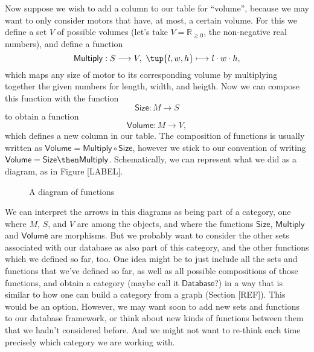 Now suppose we wish to add a column to our table for ``volume'', because we may want to only consider motors that have, at most, a certain volume. For this we define a set $V$ of possible volumes (let's take $V = \mathbb{R}_{\geq 0}$, the non-negative real numbers), and define a function 
$$
\mathsf{Multiply}: S \longrightarrow V, \ \tup{l, w, h} \longmapsto l \cdot w \cdot h,
$$
which maps any size of motor to its corresponding volume by multiplying together the given numbers for length, width, and heigth.  Now we can compose this function with the function
$$
\mathsf{Size}: M \longrightarrow S
$$
to obtain a function 
$$
\mathsf{Volume}: M \longrightarrow V,
$$
which defines a new column in our table. The composition of functions is usually written as $\mathsf{Volume} = \mathsf{Multiply} \circ \mathsf{Size}$, however we stick to our convention of writing $\mathsf{Volume} = \mathsf{Size} \then \mathsf{Multiply}$. Schematically, we can represent what we did as a diagram, as in Figure [LABEL].



\begin{figure}[h!]
\begin{center}
\end{center}
\caption{A diagram of functions \label{fig:intermodal}}
\end{figure}

We can interpret the arrows in this diagrams as being part of a category, one where $M$, $S$, and $V$ are among the objects, and where the functions $\mathsf{Size}$, $\mathsf{Multiply}$ and $\mathsf{Volume}$ are morphisms. But we probably want to consider the other sets associated with our database as also part of this category, and the other functions which we defined so far, too. One idea might be to just include all the sets and functions that we've defined so far, as well as all possible compositions of those functions, and obtain a category (maybe call it $\mathsf{Database}$?) in a way that is similar to how one can build a category from a graph (Section [REF]). This would be an option. However, we may want soon to add new sets and functions to our database framework, or think about new kinds of functions between them that we hadn't considered before. And we might not want to re-think each time precisely which category we are working with. 

